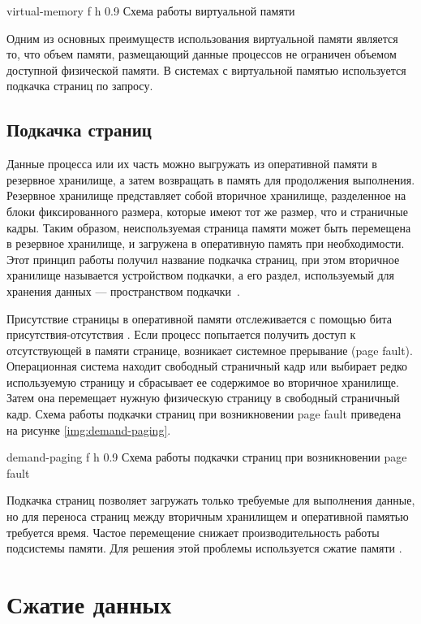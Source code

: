     {virtual-memory}
    {f}
    {h}
    {0.9\textwidth}
    {Схема работы виртуальной памяти}
    
Одним из основных преимуществ использования виртуальной памяти является то, что объем памяти, размещающий данные процессов не ограничен объемом доступной физической памяти. В системах с виртуальной памятью используется подкачка страниц по запросу.

\subsection{Подкачка страниц}

Данные процесса или их часть можно выгружать из оперативной памяти в резервное хранилище, а затем возвращать в память для продолжения выполнения. Резервное хранилище представляет собой вторичное хранилище, разделенное на блоки фиксированного размера, которые имеют тот же размер, что и страничные кадры. Таким образом, неиспользуемая страница памяти может быть перемещена в резервное хранилище, и загружена в оперативную память при необходимости. Этот принцип работы получил название подкачка страниц, при этом вторичное хранилище называется устройством подкачки, а его раздел, используемый для хранения данных --- пространством подкачки~\cite{swapping}.

Присутствие страницы в оперативной памяти отслеживается с помощью бита присутствия-отсутствия \cite{address-space}. Если процесс попытается получить доступ к отсутствующей в памяти странице, возникает системное прерывание (page fault). Операционная система находит свободный страничный кадр или выбирает редко используемую страницу и сбрасывает ее содержимое во вторичное хранилище. Затем она перемещает нужную физическую страницу в свободный страничный кадр. Схема работы подкачки страниц при возникновении page fault приведена на рисунке \ref{img:demand-paging}.

    {demand-paging}
    {f}
    {h}
    {0.9\textwidth}
    {Схема работы подкачки страниц при возникновении page fault}
    
Подкачка страниц позволяет загружать только требуемые для выполнения данные, но для переноса страниц между вторичным хранилищем и оперативной памятью требуется время. Частое перемещение снижает производительность работы подсистемы памяти. Для решения этой проблемы используется сжатие памяти \cite{swapping-problem}.

\section{Сжатие данных}\label{compression}

